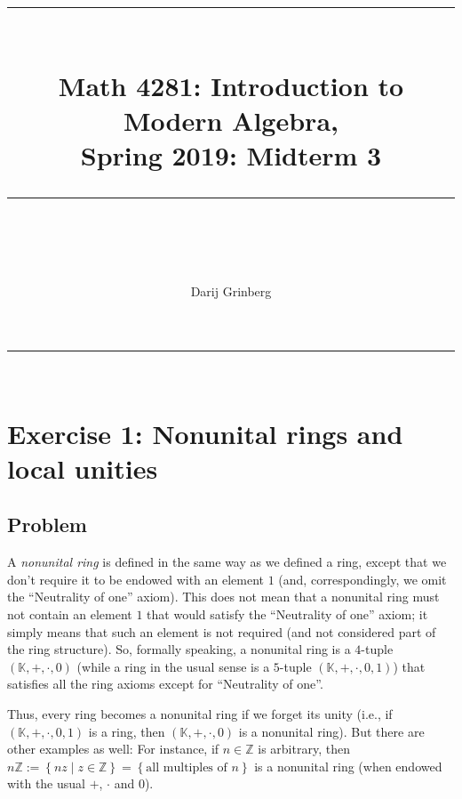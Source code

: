 \documentclass[paper=a4, fontsize=12pt]{scrartcl}%
\theoremstyle{plainsl}
\theoremstyle{definition}
\theoremstyle{remark}
\begin{document}
\title{ \\[25pt] \rule{\linewidth}{0.5pt} \\[0.4cm] {\huge Math 4281: Introduction to Modern Algebra, }\\Spring 2019: Midterm 3\\\rule{\linewidth}{2pt} \\[0.5cm] }
\author{Darij Grinberg}
\maketitle

\rule{\linewidth}{0.3pt} \\[0.4cm]

\section{Exercise 1: Nonunital rings and local unities}

\subsection{Problem}

A \textit{nonunital ring} is defined in the same way as we defined a ring,
except that we don't require it to be endowed with an element $1$ (and,
correspondingly, we omit the ``Neutrality of one'' axiom). This does not mean
that a nonunital ring must not contain an element $1$ that would satisfy the
``Neutrality of one'' axiom; it simply means that such an element is not
required (and not considered part of the ring structure). So, formally
speaking, a nonunital ring is a $4$-tuple $\left(  \mathbb{K}, +, \cdot, 0
\right)  $ (while a ring in the usual sense is a $5$-tuple $\left(
\mathbb{K}, +, \cdot, 0, 1 \right)  $) that satisfies all the ring axioms
except for ``Neutrality of one''.

Thus, every ring becomes a nonunital ring if we forget its unity (i.e., if
$\left(  \mathbb{K}, +, \cdot, 0, 1 \right)  $ is a ring, then $\left(
\mathbb{K}, +, \cdot, 0 \right)  $ is a nonunital ring). But there are other
examples as well: For instance, if $n \in\mathbb{Z}$ is arbitrary, then $n
\mathbb{Z} := \left\{  nz \mid z \in\mathbb{Z} \right\}  = \left\{  \text{all
multiples of } n \right\}  $ is a nonunital ring (when endowed with the usual
$+$, $\cdot$ and $0$).
\end{document}
